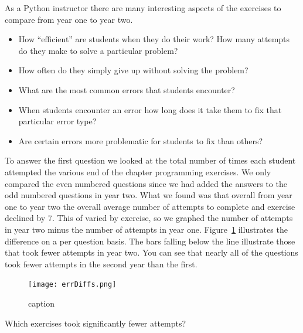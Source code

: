 As a Python instructor there are many interesting aspects of the exercises to compare from year one to year two.  

\begin{itemize}
	\item How ``efficient'' are students when they do their work?  How many attempts do they make to solve a particular problem?
	\item How often do they simply give up without solving the problem?
	\item What are the most common errors that students encounter?
	\item When students encounter an error how long does it take them to fix that particular error type?
	\item Are certain errors more problematic for students to fix than others?
\end{itemize}

To answer the first question we looked at the total number of times each student attempted the various end of the chapter programming exercises.  We only compared the even numbered questions since we had added the answers to the odd numbered questions in year two.  What we found was that overall from year one to year two the overall average number of attempts to complete and exercise declined by 7.  This of varied by exercise, so we graphed the number of attempts in year two minus the number of attempts in year one.    Figure~\ref{fig:attempts} illustrates the difference on a per question basis. The bars falling below the line illustrate those that took fewer attempts in year two.  You can see that nearly all of the questions took fewer attempts in the second year than the first.

\begin{figure}[htbp]
	\centering
		\texttt{[image: errDiffs.png]}
	\caption{caption}
	\label{fig:attempts}
\end{figure}

Which exercises took significantly fewer attempts?



